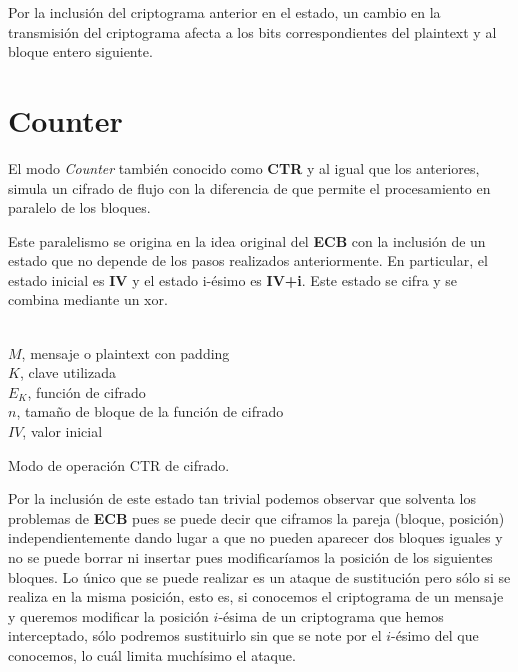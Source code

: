 Por la inclusión del criptograma anterior en el estado, un cambio en la transmisión del criptograma afecta a los bits correspondientes del plaintext y al bloque entero siguiente.

\section{Counter}
\label{sec:CTR}
El modo \textit{Counter} también conocido como \textbf{CTR} y al igual que los anteriores, simula un cifrado de flujo con la diferencia de que permite el procesamiento en paralelo de los bloques.

Este paralelismo se origina en la idea original del \textbf{ECB} con la inclusión de un estado que no depende de los pasos realizados anteriormente. En particular, el estado inicial es \textbf{IV} y el estado i-ésimo es \textbf{IV+i}. Este estado se cifra y se combina mediante un xor.

\begin{algorithm}[H]
	\begin{algorithmic}[1]
		\small
		\REQUIRE \ \\
			\texttt{$M$}, mensaje o plaintext con padding\\
			\texttt{$K$}, clave utilizada\\
			\texttt{$E_K$}, función de cifrado\\
			\texttt{$n$}, tamaño de bloque de la función de cifrado\\
			\texttt{$IV$}, valor inicial\\
		
		\ENDFOR
	\end{algorithmic}

	\caption{Modo de operación CTR de cifrado.}
	\label{alg:CTR}
\end{algorithm}

Por la inclusión de este estado tan trivial podemos observar que solventa los problemas de \textbf{ECB} pues se puede decir que ciframos la pareja (bloque, posición) independientemente dando lugar a que no pueden aparecer dos bloques iguales y no se puede borrar ni insertar pues modificaríamos la posición de los siguientes bloques. Lo único que se puede realizar es un ataque de sustitución pero sólo si se realiza en la misma posición, esto es, si conocemos el criptograma de un mensaje y queremos modificar la posición $i$-ésima de un criptograma que hemos interceptado, sólo podremos sustituirlo sin que se note por el $i$-ésimo del que conocemos, lo cuál limita muchísimo el ataque.